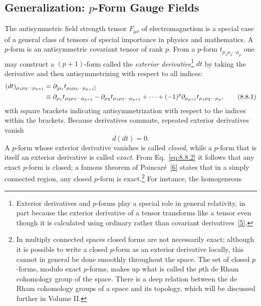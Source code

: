 
\subsection[Generalization: \texorpdfstring{$p$}{p}-Form Gauge Fields]{Generalization: \texorpdfstring{$p$}{p}-Form Gauge
Fields\texorpdfstring{\protect\footnotemark}{}}

The antisymmetric field strength tensor $F_{\mu\nu}$ of electromagnetism is a
special case of a general class of tensors of special importance in physics
and mathematics. A $p$-form is an antisymmetric covariant tensor of rank $p$.
From a $p$-form $t_{\mu_1\mu_2\cdots\mu_p}$ one may construct a $(p+1)$-form
called the \emph{exterior derivative}\footnote{Exterior derivatives and
$p$-forms play a special role in general relativity, in part because the
exterior derivative of a tensor transforms like a tensor even though it is
calculated using ordinary rather than covariant derivatives~\hyperref[ref:8.5]{[5]}.} $dt$ by
taking the derivative and then antisymmetrizing with respect to all indices:
\begin{align}
(dt)_{\mu_1\mu_2\cdots\mu_{p+1}}
&=\partial_{[\mu_1}t_{\mu_2\mu_3\cdots\mu_{p+1}]}
\notag\\
&\equiv\partial_{\mu_1}t_{\mu_2\mu_3\cdots\mu_{p+1}}
-\partial_{\mu_2}t_{\mu_1\mu_3\cdots\mu_{p+1}}+\cdots
+(-1)^p\partial_{\mu_{p+1}}t_{\mu_1\mu_2\cdots\mu_p},
\tag{8.8.1}\label{eq:8.8.1}
\end{align}
with square brackets indicating antisymmetrization with respect to the
indices within the brackets. Because derivatives commute, repeated exterior
derivatives vanish
\begin{equation}
d(dt)=0.
\tag{8.8.2}\label{eq:8.8.2}
\end{equation}
A $p$-form whose exterior derivative vanishes is called \emph{closed}, while
a $p$-form that is itself an exterior derivative is called \emph{exact}. From
Eq.~\eqref{eq:8.8.2} it follows that any exact $p$-form is closed; a famous theorem of
Poincaré~\hyperref[ref:8.6]{[6]} states that in a simply connected region, any closed $p$-form is
exact.\footnote{In multiply connected spaces closed forms are not necessarily
exact; although it is possible to write a closed $p$-form as an exterior
derivative locally, this cannot in general be done smoothly throughout the
space. The set of closed $p$-forms, modulo exact $p$-forms, makes up what is
called the $p$th de Rham cohomology group of the space. There is a deep
relation between the de Rham cohomology groups of a space and its topology,
which will be discussed further in Volume II.} For instance, the homogeneous
